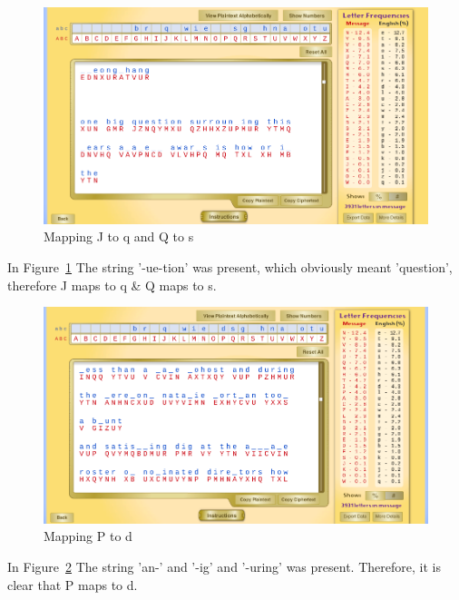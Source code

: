 \documentclass[12pt]{article}
\begin{document}
\begin{figure}[H]
    \begin{center}
        \includegraphics[scale=0.48]{c10.png}
    \end{center}{}
    \caption{Mapping J to q and Q to s}
    \label{fig:c10}
\end{figure}

In Figure~\ref{fig:c10} The string '-ue-tion' was present, which obviously meant 'question', therefore J maps to q & Q
maps to s.


\begin{figure}[H]
    \begin{center}
        \includegraphics[scale=0.48]{c11.png}
    \end{center}{}
    \caption{Mapping P to d}
    \label{fig:c11}
\end{figure}

In Figure~\ref{fig:c11} The string 'an-' and '-ig' and '-uring' was present. Therefore, it is clear that P maps to d.
\end{document}
